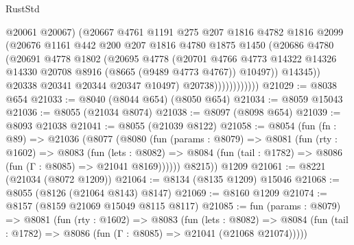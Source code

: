 \begin{lexlean}{RustStd}
\begin{coremodule}
                            @20061
                            @20067)
                          (@20667
                            @4761
                            @1191
                            @275
                            @207
                            @1816
                            @4782
                            @1816
                            @2099
                            (@20676
                              @1161
                              @442
                              @200
                              @207
                              @1816
                              @4780
                              @1875
                              @1450
                              (@20686
                                @4780
                                (@20691
                                  @4778
                                  @1802
                                  (@20695
                                    @4778
                                    (@20701
                                      @4766
                                      @4773
                                      @14322
                                      @14326
                                      @14330
                                      @20708
                                      @8916
                                      (@8665 (@9489 @4773 @4767))
                                      @10497))
                                  @14345))
                              @20338
                              @20341
                              @20344
                              @20347
                              @10497)
                            @20738))))))))))))
@21029 := @8038 @654
@21033 := @8040 (@8044 @654) (@8050 @654)
@21034 := @8059 @15043
@21036 := @8055 (@21034 @8074)
@21038 := @8097 (@8098 @654)
@21039 := @8093 @21038
@21041 := @8055 (@21039 @8122)
@21058 := @8054
    (fun (fn : @89) =>
    @21036
      (@8077
        (@8080
          (fun (params : @8079) =>
          @8081
            (fun (rty : @1602) =>
            @8083
              (fun (lets : @8082) =>
              @8084 (fun (tail : @1782) => @8086 (fun (Γ : @8085) => @21041 @8169))))))
        @8215))
    @1209
@21061 := @8221 (@21034 (@8072 @1209))
@21064 := @8134 (@8135 @1209) @15046
@21068 := @8055 (@8126 (@21064 @8143) @8147)
@21069 := @8160 @1209
@21074 := @8157 (@8159 @21069 @15049 @8115 @8117)
@21085 := fun (params : @8079) =>
  @8081
    (fun (rty : @1602) =>
    @8083
      (fun (lets : @8082) =>
      @8084 (fun (tail : @1782) => @8086 (fun (Γ : @8085) => @21041 (@21068 @21074)))))

\end{coremodule}
\end{lexlean}
